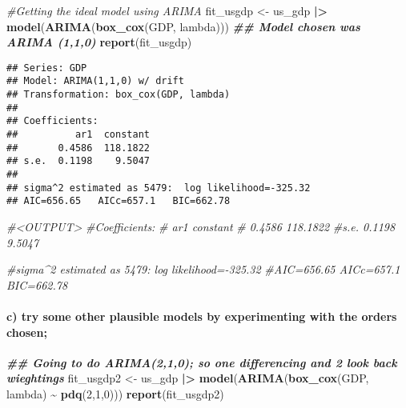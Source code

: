 \documentclass[
]{article}
\newenvironment{Shaded}{\begin{snugshade}}{\end{snugshade}}
\newcommand{\CommentTok}[1]{\textcolor[rgb]{0.56,0.35,0.01}{\textit{#1}}}
\newcommand{\DecValTok}[1]{\textcolor[rgb]{0.00,0.00,0.81}{#1}}
\newcommand{\DocumentationTok}[1]{\textcolor[rgb]{0.56,0.35,0.01}{\textbf{\textit{#1}}}}
\newcommand{\FunctionTok}[1]{\textcolor[rgb]{0.13,0.29,0.53}{\textbf{#1}}}
\newcommand{\NormalTok}[1]{#1}
\newcommand{\OtherTok}[1]{\textcolor[rgb]{0.56,0.35,0.01}{#1}}
\newcommand{\SpecialCharTok}[1]{\textcolor[rgb]{0.81,0.36,0.00}{\textbf{#1}}}
\begin{document}
\begin{Shaded}
\begin{Highlighting}[]
\CommentTok{\#Getting the ideal model using ARIMA}
\NormalTok{fit\_usgdp }\OtherTok{\textless{}{-}}\NormalTok{ us\_gdp }\SpecialCharTok{|\textgreater{}}  \FunctionTok{model}\NormalTok{(}\FunctionTok{ARIMA}\NormalTok{(}\FunctionTok{box\_cox}\NormalTok{(GDP, lambda)))}
\DocumentationTok{\#\# Model chosen was ARIMA (1,1,0)}
\FunctionTok{report}\NormalTok{(fit\_usgdp)}
\end{Highlighting}
\end{Shaded}

\begin{verbatim}
## Series: GDP 
## Model: ARIMA(1,1,0) w/ drift 
## Transformation: box_cox(GDP, lambda) 
## 
## Coefficients:
##          ar1  constant
##       0.4586  118.1822
## s.e.  0.1198    9.5047
## 
## sigma^2 estimated as 5479:  log likelihood=-325.32
## AIC=656.65   AICc=657.1   BIC=662.78
\end{verbatim}

\begin{Shaded}
\begin{Highlighting}[]
\CommentTok{\#\textless{}OUTPUT\textgreater{}}
\CommentTok{\#Coefficients:}
\CommentTok{\#         ar1  constant}
\CommentTok{\#      0.4586  118.1822}
\CommentTok{\#s.e.  0.1198    9.5047}

\CommentTok{\#sigma\^{}2 estimated as 5479:  log likelihood={-}325.32}
\CommentTok{\#AIC=656.65   AICc=657.1   BIC=662.78}
\end{Highlighting}
\end{Shaded}

\paragraph{c) try some other plausible models by experimenting with the
orders
chosen;}\label{c-try-some-other-plausible-models-by-experimenting-with-the-orders-chosen}

\begin{Shaded}
\begin{Highlighting}[]
\DocumentationTok{\#\# Going to do ARIMA(2,1,0); so one differencing and 2 look back wieghtings}
\NormalTok{fit\_usgdp2 }\OtherTok{\textless{}{-}}\NormalTok{ us\_gdp }\SpecialCharTok{|\textgreater{}}  \FunctionTok{model}\NormalTok{(}\FunctionTok{ARIMA}\NormalTok{(}\FunctionTok{box\_cox}\NormalTok{(GDP, lambda) }\SpecialCharTok{\textasciitilde{}} \FunctionTok{pdq}\NormalTok{(}\DecValTok{2}\NormalTok{,}\DecValTok{1}\NormalTok{,}\DecValTok{0}\NormalTok{)))}
\FunctionTok{report}\NormalTok{(fit\_usgdp2)}
\end{Highlighting}
\end{Shaded}
\end{document}
